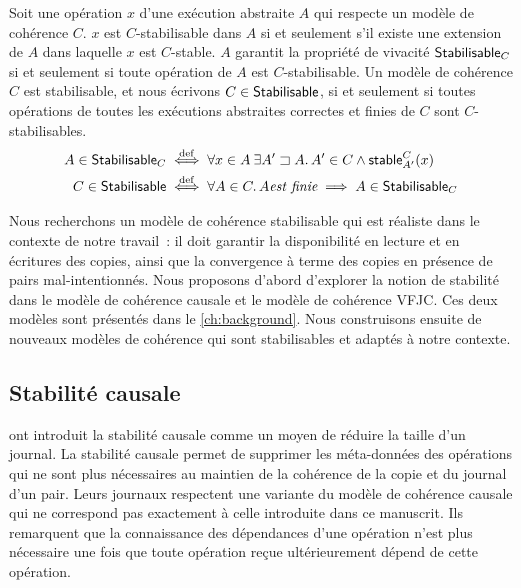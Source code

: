 \begin{definition}\label{def:stabilisable}
Soit une opération $x$ d'une exécution abstraite $A$ qui respecte un modèle de cohérence $C$.
$x$ est $C$-stabilisable dans $A$ si et seulement s'il existe une extension de $A$ dans laquelle $x$ est $C$-stable.
$A$ garantit la propriété de vivacité $\operatorname{\mathsf{Stabilisable}}_C$ si et seulement si toute opération de $A$ est $C$-stabilisable.
Un modèle de cohérence $C$ est stabilisable, et nous écrivons $C \in \operatorname{\mathsf{Stabilisable}}$, si et seulement si toutes opérations de toutes les exécutions abstraites correctes et finies de $C$ sont $C$-stabilisables.
\begin{align*}
    A \in \operatorname{\mathsf{Stabilisable}}_C &\overset{\mathrm{def}}{\iff} \forall x \in A \:\exists A' \sqsupset A \ldotp A' \in C \land \operatorname{\mathsf{stable}}_{A'}^C(x)\\
    C \in \operatorname{\mathsf{Stabilisable}} &\overset{\mathrm{def}}{\iff} \forall A \in C \ldotp A \textit{est finie} \implies A \in \operatorname{\mathsf{Stabilisable}}_C
\end{align*}
\end{definition}

Nous recherchons un modèle de cohérence stabilisable qui est réaliste dans le contexte de notre travail~: il doit garantir la disponibilité en lecture et en écritures des copies, ainsi que la convergence à terme des copies en présence de pairs mal-intentionnés.
Nous proposons d'abord d'explorer la notion de stabilité dans le modèle de cohérence causale et le modèle de cohérence \acl{VFJC}.
Ces deux modèles sont présentés dans le \autoref{ch:background}.
Nous construisons ensuite de nouveaux modèles de cohérence qui sont stabilisables et adaptés à notre contexte.


\clearpage %

\subsection{Stabilité causale}\label{subsec:cs}

\textcite{baquero_2018_pure-op-crdt} ont introduit la stabilité causale comme un moyen de réduire la taille d'un journal.
La stabilité causale permet de supprimer les méta-données des opérations qui ne sont plus nécessaires au maintien de la cohérence de la copie et du journal d'un pair.
Leurs journaux respectent une variante du modèle de cohérence causale qui ne correspond pas exactement à celle introduite dans ce manuscrit.
Ils remarquent que la connaissance des dépendances d'une opération n'est plus nécessaire une fois que toute opération reçue ultérieurement dépend de cette opération.

